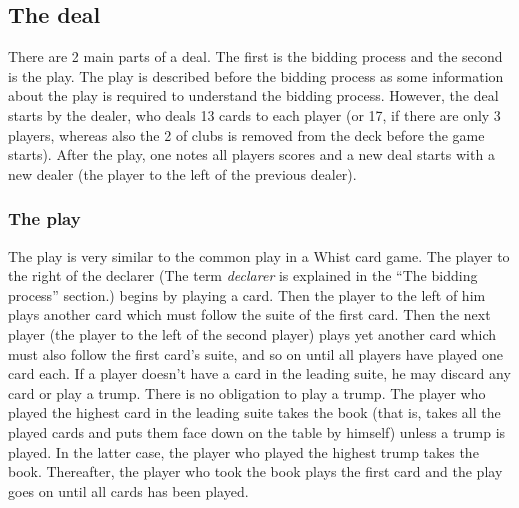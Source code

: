 \documentclass[a4paper]{article}
\begin{document}
		\subsection{The deal}
		There are 2 main parts of a deal. The first is the bidding process and the second is the play. The play is described before the bidding process as some information about the play is required to understand the bidding process. However, the deal starts by the dealer, who deals 13 cards to each player (or 17, if there are only 3 players, whereas also the 2 of clubs is removed from the deck before the game starts). After the play, one notes all players scores and a new deal starts with a new dealer (the player to the left of the previous dealer).
			\subsubsection{The play}
			The play is very similar to the common play in a Whist card game. The player to the right of the declarer (The term \emph{declarer} is explained in the ``The bidding process'' section.) begins by playing a card. Then the player to the left of him plays another card which must follow the suite of the first card. Then the next player (the player to the left of the second player) plays yet another card which must also follow the first card's suite, and so on until all players have played one card each. If a player doesn't have a card in the leading suite, he may discard any card or play a trump. There is no obligation to play a trump. The player who played the highest card in the leading suite takes the book (that is, takes all the played cards and puts them face down on the table by himself) unless a trump is played. In the latter case, the player who played the highest trump takes the book. Thereafter, the player who took the book plays the first card and the play goes on until all cards has been played.
			
\end{document}
